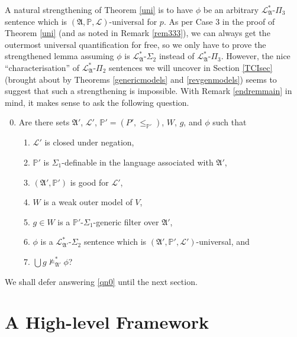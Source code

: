 \documentclass[12pt, twoside]{memoir}
\numberwithin{equation}{section}
\theoremstyle{definition}
\theoremstyle{remark}
\theoremstyle{definition}
\theoremstyle{definition}
\theoremstyle{definition}
\theoremstyle{remark}
\begin{document}
A natural strengthening of Theorem \ref{uni} is to have $\phi$ be an arbitrary $\mathcal{L}^{*}_{\mathfrak{A}}$-$\Pi_3$ sentence which is $(\mathfrak{A}, \mathbb{P}, \mathcal{L})$-universal for $p$. As per Case 3 in the proof of Theorem \ref{uni} (and as noted in Remark \ref{rem333}), we can always get the outermost universal quantification for free, so we only have to prove the strengthened lemma assuming $\phi$ is $\mathcal{L}^{*}_{\mathfrak{A}}$-$\Sigma_2$ instead of $\mathcal{L}^{*}_{\mathfrak{A}}$-$\Pi_3$. However, the nice ``characterisation'' of $\mathcal{L}^{*}_{\mathfrak{A}}$-$\Pi_2$ sentences we will uncover in Section \ref{TCIsec} (brought about by Theorems \ref{genericmodels} and \ref{revgenmodels}) seems to suggest that such a strengthening is impossible. With Remark \ref{endremmain} in mind, it makes sense to ask the following question.

\begin{enumerate}[label=(Q\arabic*)]
    \setcounter{enumi}{-1}
    \item\label{qn0} Are there sets $\mathfrak{A}'$, $\mathcal{L}'$, $\mathbb{P}' = (P', \leq_{\mathbb{P}'})$, $W$, $g$, and $\phi$ such that
    \begin{enumerate}[label=(\alph*)]
        \item $\mathcal{L}'$ is closed under negation,
        \item $\mathbb{P}'$ is $\Sigma_1$-definable in the language associated with $\mathfrak{A}'$,
        \item $(\mathfrak{A}', \mathbb{P}')$ is good for $\mathcal{L}'$,
        \item $W$ is a weak outer model of $V$,
        \item $g \in W$ is a $\mathbb{P}'$-$\Sigma_1$-generic filter over $\mathfrak{A}'$,
        \item $\phi$ is a $\mathcal{L}^{*}_{\mathfrak{A}'}$-$\Sigma_2$ sentence which is $(\mathfrak{A}', \mathbb{P}', \mathcal{L}')$-universal, and
        \item $\bigcup g \not \models^{*}_{\mathfrak{A}'} \phi$?
    \end{enumerate}
\end{enumerate}

We shall defer answering \ref{qn0} until the next section. 

\section{A High-level Framework}\label{forframe}
\end{document}
